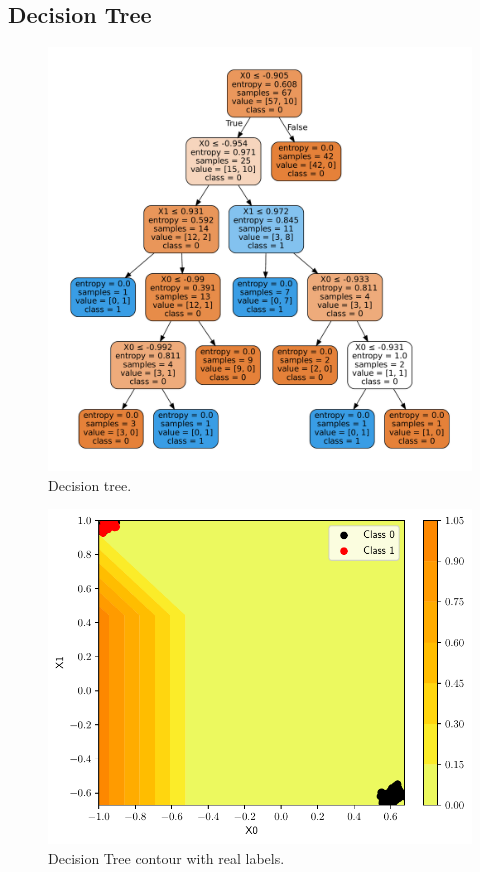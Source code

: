 \documentclass[conference]{IEEEtran}
\theoremstyle{definition}
\theoremstyle{remark}
\theoremstyle{remark}
\begin{document}
\subsection{Decision Tree}
\begin{figure}
    \includegraphics[width=\columnwidth]{figs/tree-emb-graph.pdf}
    \caption{Decision tree.}
\end{figure}

\begin{figure}
    \includegraphics[width=\columnwidth]{figs/tree-contour-0-1.pdf}
    \caption{Decision Tree contour with real labels.}
\end{figure}
\end{document}
